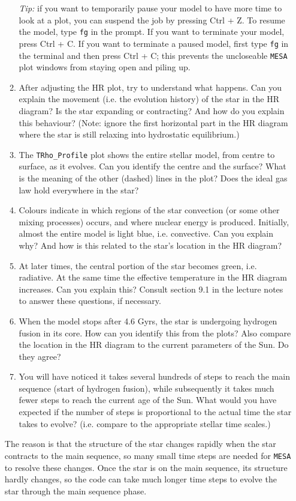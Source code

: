 \documentclass[11pt,a4paper]{article}
\begin{document}
\begin{enumerate}
\begin{enumerate}
\textit{Tip:} if you want to temporarily pause your model to have more time to look at a plot, you can suspend the job by pressing Ctrl + Z. To resume the model, type \texttt{fg} in the prompt. If you want to terminate your model, press Ctrl + C. If you want to terminate a paused model, first type \texttt{fg} in the terminal and then press Ctrl + C; this prevents the uncloseable \texttt{MESA} plot windows from staying open and piling up. 
\item After adjusting the HR plot, try to understand what happens. Can you explain the movement (i.e. the evolution history) of the star in the HR diagram? Is the star expanding or contracting? And how do you explain this behaviour? (Note: ignore the first horizontal part in the HR diagram where the star is still relaxing into hydrostatic equilibrium.)
\item The \verb|TRho_Profile| plot shows the entire stellar model, from centre to surface, as it evolves. Can you identify the centre and the surface? What is the meaning of the other (dashed) lines in the plot? Does the ideal gas law hold everywhere in the star?
\item Colours indicate in which regions of the star convection (or some other mixing processes) occurs, and where nuclear energy is produced. Initially, almost the entire model is light blue, i.e. convective. Can you explain why? And how is this related to the star's location in the HR diagram?
\item At later times, the central portion of the star becomes green, i.e. radiative. At the same time the effective temperature in the HR diagram increases. Can you explain this? Consult section 9.1 in the lecture notes to answer these questions, if necessary.
\item When the model stops after 4.6 Gyrs, the star is undergoing hydrogen fusion in its core. How can you identify this from the plots? Also compare the location in the HR diagram to the current parameters of the Sun. Do they agree?
\item You will have noticed it takes several hundreds of steps to reach the main sequence (start of hydrogen fusion), while subsequently it takes much fewer steps to reach the current age of the Sun. What would you have expected if the number of steps is proportional to the actual time the star takes to evolve? (i.e. compare to the appropriate stellar time scales.)
\end{enumerate}
The reason is that the structure of the star changes rapidly when the star contracts to the main sequence, so many small time steps are needed for \texttt{MESA} to resolve these changes. Once the star is on the main sequence, its structure hardly changes, so the code can take much longer time steps to evolve the star through the main sequence phase.


\end{enumerate}
\end{document}
